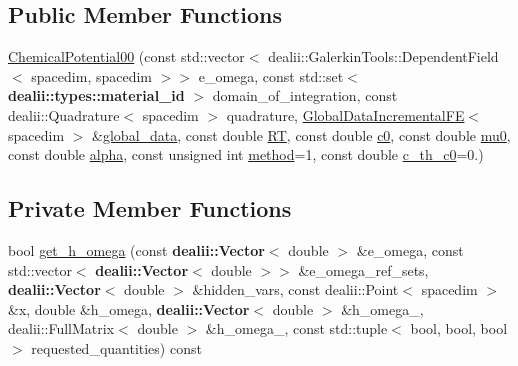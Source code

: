 \subsection*{Public Member Functions}
\begin{DoxyCompactItemize}
\item 
\hyperlink{classincremental_f_e_1_1_chemical_potential00_a0d7bd487159185d6c178de4d967ead1d}{Chemical\+Potential00} (const std\+::vector$<$ dealii\+::\+Galerkin\+Tools\+::\+Dependent\+Field$<$ spacedim, spacedim $>$$>$ e\+\_\+omega, const std\+::set$<$ {\bf dealii\+::types\+::material\+\_\+id} $>$ domain\+\_\+of\+\_\+integration, const dealii\+::\+Quadrature$<$ spacedim $>$ quadrature, \hyperlink{classincremental_f_e_1_1_global_data_incremental_f_e}{Global\+Data\+Incremental\+FE}$<$ spacedim $>$ \&\hyperlink{classincremental_f_e_1_1_chemical_potential00_a1dcd80b6f6f2906c38ad490d519e3123}{global\+\_\+data}, const double \hyperlink{classincremental_f_e_1_1_chemical_potential00_a4c90a618bdb704a4d8d36438af323408}{RT}, const double \hyperlink{classincremental_f_e_1_1_chemical_potential00_a99a75102bed91046fbbf9098de7ecd89}{c0}, const double \hyperlink{classincremental_f_e_1_1_chemical_potential00_a64b01fb87580d416b201175e7e819bcb}{mu0}, const double \hyperlink{classincremental_f_e_1_1_chemical_potential00_ad00b92c170d812c26e6429f07dd16790}{alpha}, const unsigned int \hyperlink{classincremental_f_e_1_1_chemical_potential00_ac264752dace0c782bf4c1fe5d620e6dc}{method}=1, const double \hyperlink{classincremental_f_e_1_1_chemical_potential00_aa8dbd044f314f694e09c7a1214e4a1a9}{c\+\_\+th\+\_\+c0}=0.)
\end{DoxyCompactItemize}
\subsection*{Private Member Functions}
\begin{DoxyCompactItemize}
\item 
bool \hyperlink{classincremental_f_e_1_1_chemical_potential00_a43acda281d5e7446c282cf51a3542653}{get\+\_\+h\+\_\+omega} (const {\bf dealii\+::\+Vector}$<$ double $>$ \&e\+\_\+omega, const std\+::vector$<$ {\bf dealii\+::\+Vector}$<$ double $>$$>$ \&e\+\_\+omega\+\_\+ref\+\_\+sets, {\bf dealii\+::\+Vector}$<$ double $>$ \&hidden\+\_\+vars, const dealii\+::\+Point$<$ spacedim $>$ \&x, double \&h\+\_\+omega, {\bf dealii\+::\+Vector}$<$ double $>$ \&h\+\_\+omega\+\_, dealii\+::\+Full\+Matrix$<$ double $>$ \&h\+\_\+omega\+\_, const std\+::tuple$<$ bool, bool, bool $>$ requested\+\_\+quantities) const 
\end{DoxyCompactItemize}

